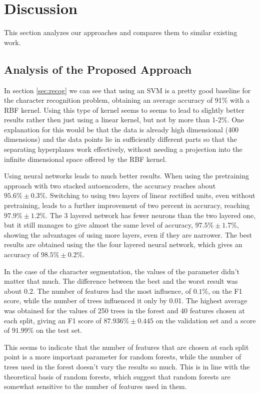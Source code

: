 \section{Discussion}
This section analyzes our approaches and compares them to similar existing work.

\subsection{Analysis of the Proposed Approach}
In section \ref{sec:recog} we can see that using an SVM is a pretty good baseline for the character recognition problem, obtaining an average accuracy of 91\% with a RBF kernel. Using this type of kernel seems to seems to lead to slightly better results rather then just using a linear kernel, but not by more than 1-2\%. One explanation for this would be that the data is already high dimensional (400 dimensions) and the data points lie in sufficiently different parts so that the separating hyperplanes work effectively, without needing a projection into the infinite dimensional space offered by the RBF kernel. 

Using neural networks leads to much better results. When using the pretraining approach with two stacked autoencoders, the accuracy reaches about $95.6\% \pm 0.3 \% $. Switching to using two layers of linear rectified units, even without pretraining, leads to a further improvement of two percent in accuracy, reaching $ 97.9\% \pm 1.2\% $. The 3 layered network has fewer neurons than the two layered one, but it still manages to give almost the same level of accuracy, $ 97.5\% \pm 1.7\% $, showing the advantages of using more layers, even if they are narrower. The best results are obtained using the the four layered neural network, which gives an accuracy of $ 98.5\% \pm 0.2\% $. 

In the case of the character segmentation, the values of the parameter didn't matter that much. The difference between the best and the worst result was about 0.2. The number of features had the most influence, of $ 0.1\% $, on the F1 score, while the number of trees influenced it only by 0.01. The highest average was obtained for the values of 250 trees in the forest and 40 features chosen at each split, giving an F1 score of $ 87.936\% \pm 0.445$ on the validation set and a score of $ 91.99\% $ on the test set.  

This seems to indicate that the number of features that are chosen at each split point is a more important parameter for random forests, while the number of trees used in the forest doesn't vary the results so much. This is in line with the theoretical basis of random forests\cite{breiman2001random}, which suggest that random forests are somewhat sensitive to the number of features used in them. 


